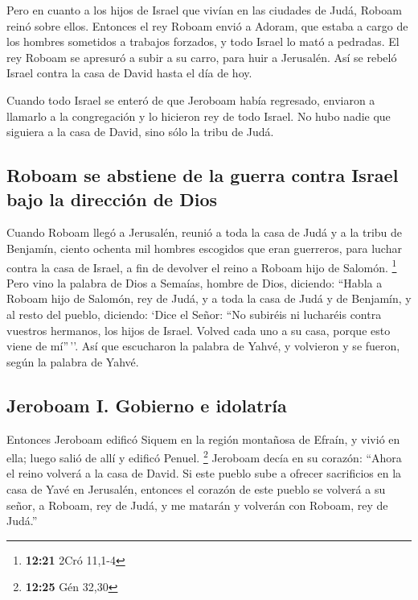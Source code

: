  Pero en cuanto a los hijos de Israel que vivían en las
ciudades de Judá, Roboam reinó sobre ellos.  Entonces el
rey Roboam envió a Adoram, que estaba a cargo de los hombres sometidos a
trabajos forzados, y todo Israel lo mató a pedradas. El rey Roboam se
apresuró a subir a su carro, para huir a Jerusalén.  Así
se rebeló Israel contra la casa de David hasta el día de hoy.

 Cuando todo Israel se enteró de que Jeroboam había
regresado, enviaron a llamarlo a la congregación y lo hicieron rey de
todo Israel. No hubo nadie que siguiera a la casa de David, sino sólo la
tribu de Judá.

\hypertarget{roboam-se-abstiene-de-la-guerra-contra-israel-bajo-la-direcciuxf3n-de-dios}{%
\subsection{Roboam se abstiene de la guerra contra Israel bajo la
dirección de
Dios}\label{roboam-se-abstiene-de-la-guerra-contra-israel-bajo-la-direcciuxf3n-de-dios}}

 Cuando Roboam llegó a Jerusalén, reunió a toda la casa
de Judá y a la tribu de Benjamín, ciento ochenta mil hombres escogidos
que eran guerreros, para luchar contra la casa de Israel, a fin de
devolver el reino a Roboam hijo de Salomón. \footnote{\textbf{12:21}
  2Cró 11,1-4}  Pero vino la palabra de Dios a Semaías,
hombre de Dios, diciendo:  ``Habla a Roboam hijo de
Salomón, rey de Judá, y a toda la casa de Judá y de Benjamín, y al resto
del pueblo, diciendo:  `Dice el Señor: ``No subiréis ni
lucharéis contra vuestros hermanos, los hijos de Israel. Volved cada uno
a su casa, porque esto viene de mí''\,''. Así que escucharon la palabra
de Yahvé, y volvieron y se fueron, según la palabra de Yahvé.

\hypertarget{jeroboam-i.-gobierno-e-idolatruxeda}{%
\subsection{Jeroboam I. Gobierno e
idolatría}\label{jeroboam-i.-gobierno-e-idolatruxeda}}

 Entonces Jeroboam edificó Siquem en la región montañosa
de Efraín, y vivió en ella; luego salió de allí y edificó Penuel.
\footnote{\textbf{12:25} Gén 32,30}  Jeroboam decía en su
corazón: ``Ahora el reino volverá a la casa de David.  Si
este pueblo sube a ofrecer sacrificios en la casa de Yavé en Jerusalén,
entonces el corazón de este pueblo se volverá a su señor, a Roboam, rey
de Judá, y me matarán y volverán con Roboam, rey de Judá.''

